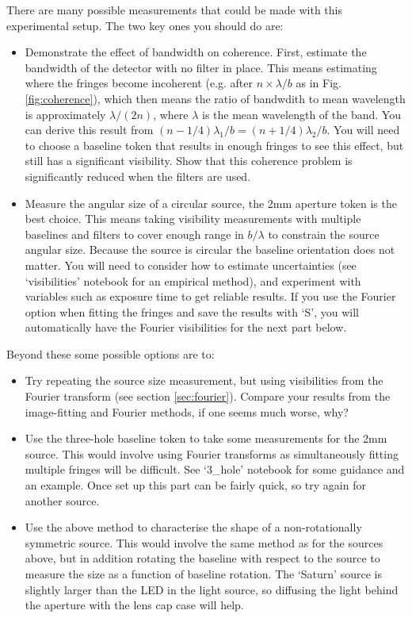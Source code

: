 \documentclass[11pt]{article}
\begin{document}
There are many possible measurements that could be made with this experimental setup. The two key ones you should do are:
\begin{itemize}
    \item Demonstrate the effect of bandwidth on coherence. First, estimate the bandwidth of the detector with no filter in place. This means estimating where the fringes become incoherent (e.g. after $n \times \lambda/b$ as in Fig. \ref{fig:coherence}), which then means the ratio of bandwdith to mean wavelength is approximately $\lambda/(2n)$, where $\lambda$ is the mean wavelength of the band. You can derive this result from $(n-1/4)\lambda_1/b = (n+1/4)\lambda_2/b$. You will need to choose a baseline token that results in enough fringes to see this effect, but still has a significant visibility. Show that this coherence problem is significantly reduced when the filters are used.
    \item Measure the angular size of a circular source, the 2mm aperture token is the best choice. This means taking visibility measurements with multiple baselines and filters to cover enough range in $b/\lambda$ to constrain the source angular size. Because the source is circular the baseline orientation does not matter. You will need to consider how to estimate uncertainties (see `visibilities' notebook for an empirical method), and experiment with variables such as exposure time to get reliable results. If you use the Fourier option when fitting the fringes and save the results with `S', you will automatically have the Fourier visibilities for the next part below.
\end{itemize}

Beyond these some possible options are to:
\begin{itemize}
    \item Try repeating the source size measurement, but using visibilities from the Fourier transform (see section \ref{sec:fourier}). Compare your results from the image-fitting and Fourier methods, if one seems much worse, why?
    \item Use the three-hole baseline token to take some measurements for the 2mm source. This would involve using Fourier transforms as simultaneously fitting multiple fringes will be difficult. See `3\_hole' notebook for some guidance and an example. Once set up this part can be fairly quick, so try again for another source.
    \item Use the above method to characterise the shape of a non-rotationally symmetric source. This would involve the same method as for the sources above, but in addition rotating the baseline with respect to the source to measure the size as a function of baseline rotation. The `Saturn' source is slightly larger than the LED in the light source, so diffusing the light behind the aperture with the lens cap case will help.
\end{itemize}
\end{document}
